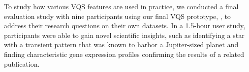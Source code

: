 \par To study how various VQS features
are used in practice,
we conducted a final evaluation study with nine participants
using our final VQS prototype, \zvpp,
to address their research questions
on their own datasets.
In a 1.5-hour user study, participants were able to
gain novel scientific insights,
such as identifying a star with a transient pattern
that was known to harbor a Jupiter-sized planet
and finding characteristic gene expression profiles confirming the results of a related publication. 

